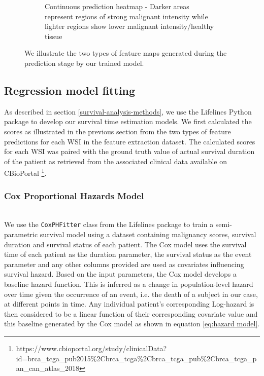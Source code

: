 \documentclass{l4proj}
\begin{document}
\begin{figure}[h]
\begin{subfigure}[b]{0.4\textwidth}
        \caption{Continuous prediction heatmap - Darker areas represent regions of strong malignant intensity while lighter regions show lower malignant intensity/healthy tissue}
        \label{fig:continuous-heatmap}
    \end{subfigure}

    \caption{We illustrate the two types of feature maps generated during the prediction stage by our trained model. }
    \label{fig:visualization-example}
\end{figure}

\subsection{Regression model fitting}
 As described in section \ref{survival-analysis-methods}, we use the Lifelines Python package to develop our survival time estimation models. We first calculated the scores as illustrated in the previous section from the two types of feature predictions for each WSI in the feature extraction dataset. The calculated scores for each WSI was paired with the ground truth value of actual survival duration of the patient as retrieved from the associated clinical data available on CBioPortal \footnote{https://www.cbioportal.org/study/clinicalData?id=brca\_tcga\_pub2015\%2Cbrca\_tcga\%2Cbrca\_tcga\_pub\%2Cbrca\_tcga\_pan\_can\_atlas\_2018}.
\\
 \subsubsection{Cox Proportional Hazards Model}\hfill\\
We use the \texttt{CoxPHFitter} class from the Lifelines package to train a semi-parametric survival model using a dataset containing malignancy scores, survival duration and survival status of each patient. The Cox model uses the survival time of each patient as the duration parameter, the survival status as the event parameter and any other columns provided are used as covariates influencing survival hazard. Based on the input parameters, the Cox model develops a baseline hazard function. This is inferred as a change in population-level hazard over time given the occurrence of an event, i.e. the death of a subject in our case, at different points in time. Any individual patient's corresponding Log-hazard is then considered to be a linear function of their corresponding covariate value and this baseline generated by the Cox model as shown in equation \ref{eq:hazard model}. 
\\
\end{document}
